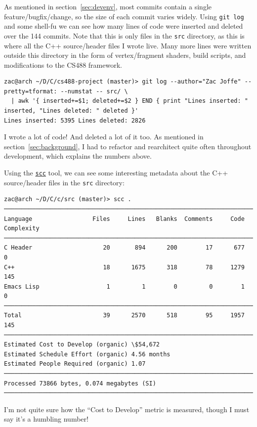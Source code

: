 \documentclass {article}
\begin{document}
As mentioned in section~\ref{sec:devenv}, most commits contain a single feature/bugfix/change, so the size of each commit varies widely. Using \texttt{git log} and some shell-fu we can see how many lines of code were inserted and deleted over the 144 commits. Note that this is only files in the \texttt{src} directory, as this is where all the C++ source/header files I wrote live. Many more lines were written outside this directory in the form of vertex/fragment shaders, build scripts, and modifications to the CS488 framework.
\begin{verbatim}
zac@arch ~/D/C/cs488-project (master)> git log --author="Zac Joffe" --pretty=tformat: --numstat -- src/ \
  | awk '{ inserted+=$1; deleted+=$2 } END { print "Lines inserted: " inserted, "Lines deleted: " deleted }'
Lines inserted: 5395 Lines deleted: 2826
\end{verbatim}

I wrote a lot of code! And deleted a lot of it too. As mentioned in section~\ref{sec:background}, I had to refactor and rearchitect quite often throughout development, which explains the numbers above.

Using the \href{https://github.com/boyter/scc}{\texttt{scc}} tool, we can see some interesting metadata about the C++ source/header files in the \texttt{src} directory:
\begin{verbatim}
zac@arch ~/D/C/c/src (master)> scc .
───────────────────────────────────────────────────────────────────────────────
Language                 Files     Lines   Blanks  Comments     Code Complexity
───────────────────────────────────────────────────────────────────────────────
C Header                    20       894      200        17      677          0
C++                         18      1675      318        78     1279        145
Emacs Lisp                   1         1        0         0        1          0
───────────────────────────────────────────────────────────────────────────────
Total                       39      2570      518        95     1957        145
───────────────────────────────────────────────────────────────────────────────
Estimated Cost to Develop (organic) \$54,672
Estimated Schedule Effort (organic) 4.56 months
Estimated People Required (organic) 1.07
───────────────────────────────────────────────────────────────────────────────
Processed 73866 bytes, 0.074 megabytes (SI)
───────────────────────────────────────────────────────────────────────────────
\end{verbatim}
I'm not quite sure how the ``Cost to Develop'' metric is measured, though I must say it's a humbling number!
\end{document}
